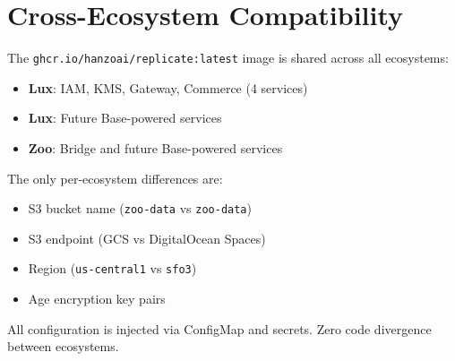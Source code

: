 \section{Cross-Ecosystem Compatibility}


The \texttt{ghcr.io/hanzoai/replicate:latest} image is shared
across all ecosystems:

\begin{itemize}
\item \textbf{Lux}: IAM, KMS, Gateway, Commerce (4 services)
\item \textbf{Lux}: Future Base-powered services
\item \textbf{Zoo}: Bridge and future Base-powered services
\end{itemize}

The only per-ecosystem differences are:
\begin{itemize}
\item S3 bucket name (\texttt{zoo-data} vs \texttt{zoo-data})
\item S3 endpoint (GCS vs DigitalOcean Spaces)
\item Region (\texttt{us-central1} vs \texttt{sfo3})
\item Age encryption key pairs
\end{itemize}

All configuration is injected via ConfigMap and secrets.
Zero code divergence between ecosystems.

